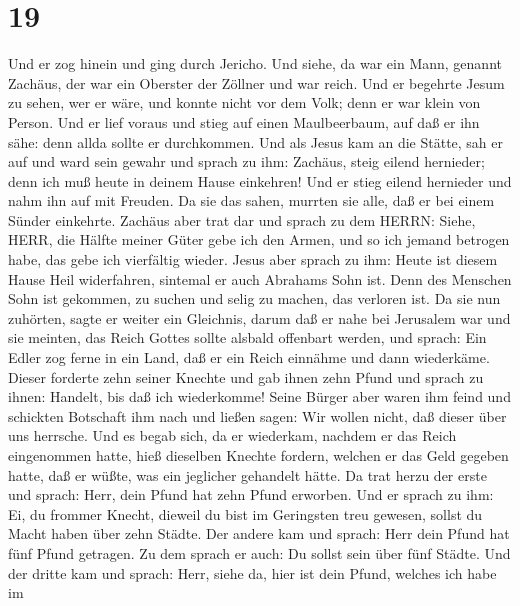 \hypertarget{section-18}{%
\section{19}\label{section-18}}

 Und er zog hinein und ging durch Jericho.  Und
siehe, da war ein Mann, genannt Zachäus, der war ein Oberster der
Zöllner und war reich.  Und er begehrte Jesum zu sehen, wer
er wäre, und konnte nicht vor dem Volk; denn er war klein von Person.
 Und er lief voraus und stieg auf einen Maulbeerbaum, auf
daß er ihn sähe: denn allda sollte er durchkommen.  Und als
Jesus kam an die Stätte, sah er auf und ward sein gewahr und sprach zu
ihm: Zachäus, steig eilend hernieder; denn ich muß heute in deinem Hause
einkehren!  Und er stieg eilend hernieder und nahm ihn auf
mit Freuden.  Da sie das sahen, murrten sie alle, daß er bei
einem Sünder einkehrte.  Zachäus aber trat dar und sprach zu
dem HERRN: Siehe, HERR, die Hälfte meiner Güter gebe ich den Armen, und
so ich jemand betrogen habe, das gebe ich vierfältig wieder.
 Jesus aber sprach zu ihm: Heute ist diesem Hause Heil
widerfahren, sintemal er auch Abrahams Sohn ist.  Denn des
Menschen Sohn ist gekommen, zu suchen und selig zu machen, das verloren
ist.  Da sie nun zuhörten, sagte er weiter ein Gleichnis,
darum daß er nahe bei Jerusalem war und sie meinten, das Reich Gottes
sollte alsbald offenbart werden,  und sprach: Ein Edler zog
ferne in ein Land, daß er ein Reich einnähme und dann wiederkäme.
 Dieser forderte zehn seiner Knechte und gab ihnen zehn
Pfund und sprach zu ihnen: Handelt, bis daß ich wiederkomme!
 Seine Bürger aber waren ihm feind und schickten Botschaft
ihm nach und ließen sagen: Wir wollen nicht, daß dieser über uns
herrsche.  Und es begab sich, da er wiederkam, nachdem er
das Reich eingenommen hatte, hieß dieselben Knechte fordern, welchen er
das Geld gegeben hatte, daß er wüßte, was ein jeglicher gehandelt hätte.
 Da trat herzu der erste und sprach: Herr, dein Pfund hat
zehn Pfund erworben.  Und er sprach zu ihm: Ei, du frommer
Knecht, dieweil du bist im Geringsten treu gewesen, sollst du Macht
haben über zehn Städte.  Der andere kam und sprach: Herr
dein Pfund hat fünf Pfund getragen.  Zu dem sprach er auch:
Du sollst sein über fünf Städte.  Und der dritte kam und
sprach: Herr, siehe da, hier ist dein Pfund, welches ich habe im
